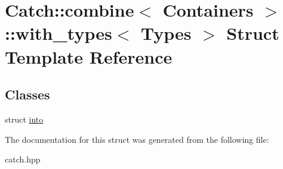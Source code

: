 \hypertarget{structCatch_1_1combine_1_1with__types}{}\section{Catch\+::combine$<$ Containers $>$\+::with\+\_\+types$<$ Types $>$ Struct Template Reference}
\label{structCatch_1_1combine_1_1with__types}
\subsection*{Classes}
\begin{DoxyCompactItemize}
\item 
struct \mbox{\hyperlink{structCatch_1_1combine_1_1with__types_1_1into}{into}}
\end{DoxyCompactItemize}


The documentation for this struct was generated from the following file\+:\begin{DoxyCompactItemize}
\item 
catch.\+hpp\end{DoxyCompactItemize}
